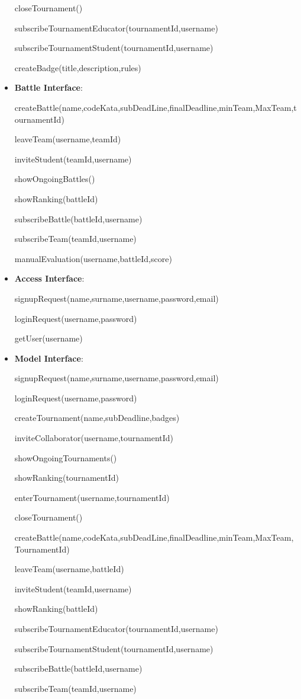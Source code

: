 \begin{itemize}
closeTournament()

subscribeTournamentEducator(tournamentId,username)

subscribeTournamentStudent(tournamentId,username)

createBadge(title,description,rules)
\item\textbf{Battle Interface}:

createBattle(name,codeKata,subDeadLine,finalDeadline,minTeam,MaxTeam,tournamentId)

leaveTeam(username,teamId)

inviteStudent(teamId,username)

showOngoingBattles()

showRanking(battleId)

subscribeBattle(battleId,username)

subscribeTeam(teamId,username)

manualEvaluation(username,battleId,score)
\item\textbf{Access Interface}:

signupRequest(name,surname,username,password,email)

loginRequest(username,password)

getUser(username)
\item\textbf{Model Interface}:

signupRequest(name,surname,username,password,email)

loginRequest(username,password)

createTournament(name,subDeadline,badges)

inviteCollaborator(username,tournamentId)

showOngoingTournaments()

showRanking(tournamentId)

enterTournament(username,tournamentId)

closeTournament()

createBattle(name,codeKata,subDeadLine,finalDeadline,minTeam,MaxTeam,TournamentId)

leaveTeam(username,battleId)

inviteStudent(teamId,username)

showRanking(battleId)

subscribeTournamentEducator(tournamentId,username)

subscribeTournamentStudent(tournamentId,username)

subscribeBattle(battleId,username)

subscribeTeam(teamId,username)


\end{itemize}
